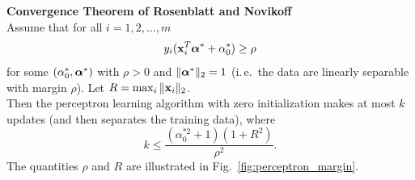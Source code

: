  \textbf{Convergence Theorem of Rosenblatt and Novikoff}\\
    Assume that for all $i=1,2, \dots, m$
    \begin{displaymath}
      y_i(\bm{\mathrm{x}}_i^T\bm{\mathrm{\alpha}}^* +\alpha^*_0)\geq \rho
    \end{displaymath}
    for some $(\alpha_0^*,\bm{\mathrm{\alpha}}^*)$ with $\rho>0$ and $\|\bm{\mathrm{\alpha}}^*\|_2=1$ (i.\,e.\ the data are linearly separable with margin $\rho$).
    Let $R= \max_i \|\bm{\mathrm{x}}_i\|_2$. \\
    
Then the perceptron learning algorithm with zero initialization makes at most $k$ updates (and then separates the training data), where
    \begin{displaymath}
      k \leq \frac{(\alpha_0^{*2}+1)(1+R^2)}{\rho^2}.
    \end{displaymath}
    The quantities $\rho$ and $R$ are illustrated in Fig.~\ref{fig:perceptron_margin}.

